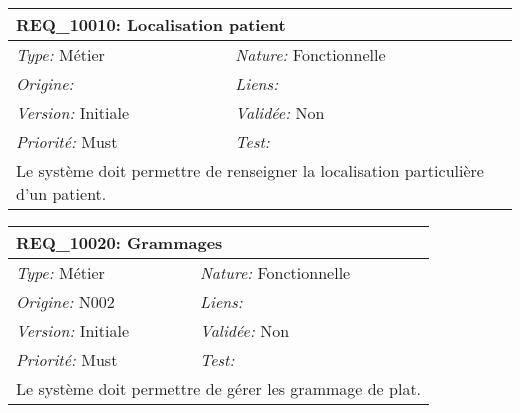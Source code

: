 \begin{table}[!ht]

\begin{tabular}{|p{60mm}p{100mm}|}

\hline

\multicolumn{2}{|l|}{\textbf{REQ\_10010:} Localisation patient} \\ \hline

\emph{Type:} Métier & \emph{Nature:} Fonctionnelle \\

\emph{Origine:}  & \emph{Liens:}  \\

\emph{Version:} Initiale & \emph{Validée:} Non \\

\emph{Priorité:} Must & \emph{Test:} \\ \hline

\multicolumn{2}{|p{16cm}|}{Le système doit permettre de renseigner la localisation particulière d'un patient.} \\ \hline

\end{tabular}

\end{table}



\begin{table}[!ht]

\begin{tabular}{|p{60mm}p{100mm}|}

\hline

\multicolumn{2}{|l|}{\textbf{REQ\_10020:} Grammages} \\ \hline

\emph{Type:} Métier & \emph{Nature:} Fonctionnelle \\

\emph{Origine:} N002 & \emph{Liens:}  \\

\emph{Version:} Initiale & \emph{Validée:} Non \\

\emph{Priorité:} Must & \emph{Test:} \\ \hline

\multicolumn{2}{|p{16cm}|}{Le système doit permettre de gérer les grammage de plat.} \\ \hline

\end{tabular}

\end{table}



